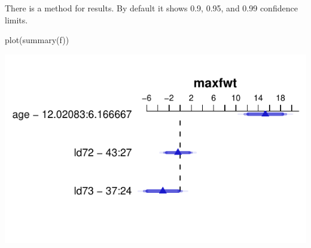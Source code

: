 There is a  method for  results.  By default it
shows 0.9, 0.95, and 0.99 confidence limits. \ipacue
\begin{Schunk}
\begin{Sinput}
plot(summary(f))
\end{Sinput}


\centerline{\includegraphics{rmsintro-unnamed-chunk-20-1} }

\end{Schunk}

